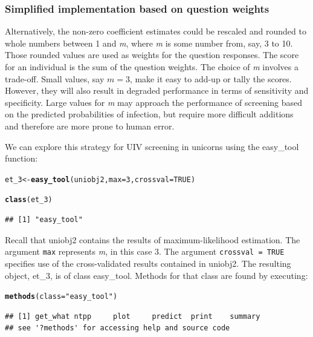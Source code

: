 \documentclass[11pt]{report}\usepackage[]{graphicx}\usepackage[]{xcolor}
\makeatletter
\newcommand{\hlnum}[1]{\textcolor[rgb]{0.686,0.059,0.569}{#1}}%
\newcommand{\hlstr}[1]{\textcolor[rgb]{0.192,0.494,0.8}{#1}}%
\newcommand{\hlstd}[1]{\textcolor[rgb]{0.345,0.345,0.345}{#1}}%
\newcommand{\hlkwb}[1]{\textcolor[rgb]{0.69,0.353,0.396}{#1}}%
\newcommand{\hlkwc}[1]{\textcolor[rgb]{0.333,0.667,0.333}{#1}}%
\newcommand{\hlkwd}[1]{\textcolor[rgb]{0.737,0.353,0.396}{\textbf{#1}}}%
\newenvironment{kframe}{%
 \def\at@end@of@kframe{}%
 \ifinner\ifhmode%
  \def\at@end@of@kframe{\end{minipage}}%
  \begin{minipage}{\columnwidth}%
 \fi\fi%
 \def\FrameCommand##1{\hskip\@totalleftmargin \hskip-\fboxsep
 \colorbox{shadecolor}{##1}\hskip-\fboxsep
     \hskip-\linewidth \hskip-\@totalleftmargin \hskip\columnwidth}%
 \MakeFramed {\advance\hsize-\width
   \@totalleftmargin\z@ \linewidth\hsize
   \@setminipage}}%
 {\par\unskip\endMakeFramed%
 \at@end@of@kframe}
\newenvironment{knitrout}{}{} %
\makeatother
\begin{document}
\subsubsection*{Simplified implementation based on question weights}

Alternatively, the non-zero coefficient estimates could be rescaled
and rounded to whole numbers between 1 and \emph{m}, where \emph{m} is
some number from, say, 3 to 10. Those rounded values are used as
weights for the question responses. The score for an individual is the
sum of the question weights.  The choice of \emph{m} involves a
trade-off. Small values, say $m = 3$, make it easy to add-up or tally
the scores. However, they will also result in degraded performance in
terms of sensitivity and specificity. Large values for \emph{m} may
approach the performance of screening based on the predicted
probabilities of infection, but require more difficult additions and
therefore are more prone to human error.

We can explore this strategy for UIV screening in unicorns using the
\textsf{easy\_tool} function:
\begin{knitrout}
\color{fgcolor}\begin{kframe}
\begin{alltt}
\hlstd{et_3} \hlkwb{<-} \hlkwd{easy_tool}\hlstd{(uniobj2,} \hlkwc{max} \hlstd{=} \hlnum{3}\hlstd{,} \hlkwc{crossval} \hlstd{=} \hlnum{TRUE}\hlstd{)}
\end{alltt}


{\ttfamily\noindent\itshape\color{messagecolor}{\#\# Setting levels: control = 0, case = 1}}

{\ttfamily\noindent\itshape\color{messagecolor}{\#\# Setting direction: controls < cases}}\begin{alltt}
\hlkwd{class}\hlstd{(et_3)}
\end{alltt}
\begin{verbatim}
## [1] "easy_tool"
\end{verbatim}
\end{kframe}
\end{knitrout}
Recall that \textsf{uniobj2} contains the results of
maximum-likelihood estimation. The argument \verb|max| represents
\emph{m}, in this case 3.  The argument \verb|crossval = TRUE|
specifies use of the cross-validated results contained in
\textsf{uniobj2}.  The resulting object, \textsf{et\_3}, is of class
\textsf{easy\_tool}.  Methods for that class are found by executing:
\begin{knitrout}
\color{fgcolor}\begin{kframe}
\begin{alltt}
\hlkwd{methods}\hlstd{(}\hlkwc{class} \hlstd{=} \hlstr{"easy_tool"}\hlstd{)}
\end{alltt}
\begin{verbatim}
## [1] get_what ntpp     plot     predict  print    summary 
## see '?methods' for accessing help and source code
\end{verbatim}
\end{kframe}
\end{knitrout}
\end{document}
